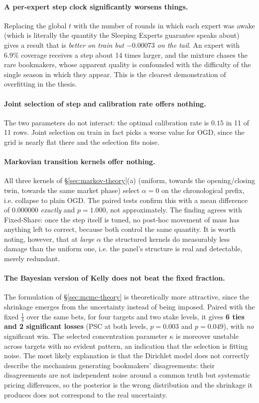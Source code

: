 \documentclass[12pt,a4paper,oneside]{report}
\renewcommand{\_}{\oldunderscore\allowbreak}
\theoremstyle{definition}
\theoremstyle{plain}
\theoremstyle{remark}
\begin{document}
\paragraph{A per-expert step clock significantly worsens things.} Replacing the global $t$ with
the number of rounds in which each expert was awake (which is literally the quantity the
Sleeping Experts guarantee speaks about) gives a result that is \emph{better on train but
$-0.00073$ on the tail}. An expert with 6.9\% coverage receives a step about 14 times larger,
and the mixture chases the rare bookmakers, whose apparent quality is confounded with the
difficulty of the single season in which they appear. This is the clearest demonstration of
overfitting in the thesis.

\paragraph{Joint selection of step and calibration rate offers nothing.} The two parameters do not
interact: the optimal calibration rate is $0.15$ in 11 of 11 rows. Joint selection on train in fact
picks a worse value for OGD, since the grid is nearly flat there and the selection fits noise.

\paragraph{Markovian transition kernels offer nothing.} All three kernels of
\S\ref{sec:markov-theory}(a) (uniform, towards the opening/closing twin, towards the same
market phase) select $\alpha = 0$ on the chronological prefix, i.e. collapse to plain OGD. The
paired tests confirm this with a mean difference of $0.000000$ \emph{exactly} and $p=1.000$,
not approximately. The finding agrees with Fixed-Share: once the step itself is tuned, no
post-hoc movement of mass has anything left to correct, because both control the same quantity.
It is worth noting, however, that at \emph{large} $\alpha$ the structured kernels do measurably
less damage than the uniform one, i.e. the panel's structure is real and detectable, merely
redundant.

\paragraph{The Bayesian version of Kelly does not beat the fixed fraction.} The formulation of
\S\ref{sec:mcmc-theory} is theoretically more attractive, since the shrinkage emerges from the
uncertainty instead of being imposed. Paired with the fixed $\tfrac14$ over the same bets, for
four targets and two stake levels, it gives \textbf{6 ties and 2 significant losses} (PSC at both
levels, $p=0.003$ and $p=0.049$), with \emph{no} significant win. The selected concentration
parameter $\kappa$ is moreover unstable across targets with no evident pattern, an indication that
the selection is fitting noise. The most likely explanation is that the Dirichlet model does not
correctly describe the mechanism generating bookmakers' disagreements: their disagreements are not
independent noise around a common truth but systematic pricing differences, so the posterior is
the wrong distribution and the shrinkage it produces does not correspond to the real uncertainty.
\end{document}
